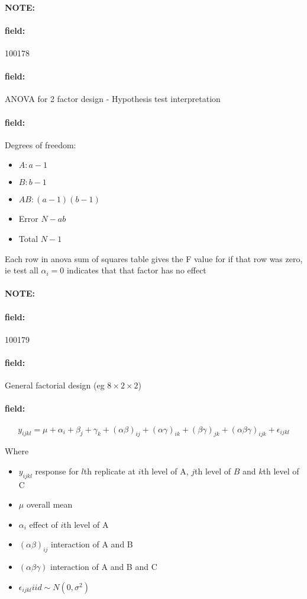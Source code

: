 \documentclass[12pt]{article}
\newenvironment{note}{\paragraph{NOTE:}}{}
\newenvironment{field}{\paragraph{field:}}{}
\begin{document}
\begin{note}
 \begin{field}
  \tiny 100178
 \end{field}
 \begin{field}
  ANOVA for 2 factor design - Hypothesis test interpretation
 \end{field}
 \begin{field}
  Degrees of freedom:
  \begin{itemize}
   \item $A: a - 1$
   \item $B: b-1$
   \item $AB: (a-1)(b-1)$
   \item Error $N - ab$
   \item Total $N-1$
  \end{itemize}
  Each row in anova sum of squares table gives the F value for if that row was zero, ie test all $\alpha_i = 0$ indicates that that factor has no effect
 \end{field}
\end{note}

\begin{note}
 \begin{field}
  \tiny 100179
 \end{field}
 \begin{field}
  General factorial design (eg $8 \times 2 \times 2$)
 \end{field}
 \begin{field}
  $$ y_{ijkl} = \mu + \alpha_i + \beta_j + \gamma_k + (\alpha\beta)_{ij} + (\alpha\gamma)_{ik} + (\beta\gamma)_{jk} + (\alpha\beta\gamma)_{ijk} + \epsilon_{ijkl} $$


  Where
  \begin{itemize}
   \item $y_{ijkl}$ response for $l$th replicate at $i$th level of A, $j$th level of $B$ and $k$th level of C
   \item $\mu$ overall mean
   \item $\alpha_i$ effect of $i$th level of A
   \item $(\alpha\beta)_{ij}$ interaction of A and B
   \item $(\alpha\beta\gamma)$ interaction of A and B and C
   \item $\epsilon_{ijkl} iid \sim N(0,\sigma^2)$
  \end{itemize}
 \end{field}
\end{note}
\end{document}
